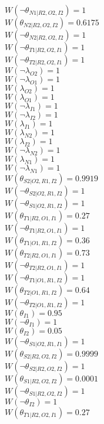 $W(\neg\theta_{N1|R2,O2,I2})=1$\\
$W(\theta_{N2|R2,O2,I2})=0.6175$\\
$W(\neg\theta_{N2|R2,O2,I2})=1$\\
$W(\neg\theta_{T1|R2,O2,I1})=1$\\
$W(\neg\theta_{T2|R2,O2,I1})=1$\\
$W(\neg\lambda_{O2})=1$\\
$W(\neg\lambda_{O1})=1$\\
$W(\lambda_{O2})=1$\\
$W(\lambda_{O1})=1$\\
$W(\neg\lambda_{I1})=1$\\
$W(\neg\lambda_{I2})=1$\\
$W(\lambda_{I1})=1$\\
$W(\lambda_{N2})=1$\\
$W(\lambda_{I2})=1$\\
$W(\neg\lambda_{N2})=1$\\
$W(\lambda_{N1})=1$\\
$W(\neg\lambda_{N1})=1$\\
$W(\theta_{S2|O2,R1,I2})=0.9919$\\
$W(\neg\theta_{S2|O2,R1,I2})=1$\\
$W(\neg\theta_{S1|O2,R1,I2})=1$\\
$W(\theta_{T1|R2,O1,I1})=0.27$\\
$W(\neg\theta_{T1|R2,O1,I1})=1$\\
$W(\theta_{T1|O1,R1,I2})=0.36$\\
$W(\theta_{T2|R2,O1,I1})=0.73$\\
$W(\neg\theta_{T2|R2,O1,I1})=1$\\
$W(\neg\theta_{T1|O1,R1,I2})=1$\\
$W(\theta_{T2|O1,R1,I2})=0.64$\\
$W(\neg\theta_{T2|O1,R1,I2})=1$\\
$W(\theta_{I1})=0.95$\\
$W(\neg\theta_{I1})=1$\\
$W(\theta_{I2})=0.05$\\
$W(\neg\theta_{S1|O2,R1,I1})=1$\\
$W(\theta_{S2|R2,O2,I2})=0.9999$\\
$W(\neg\theta_{S2|R2,O2,I2})=1$\\
$W(\theta_{S1|R2,O2,I2})=0.0001$\\
$W(\neg\theta_{S1|R2,O2,I2})=1$\\
$W(\neg\theta_{I2})=1$\\
$W(\theta_{T1|R2,O2,I1})=0.27$\\
